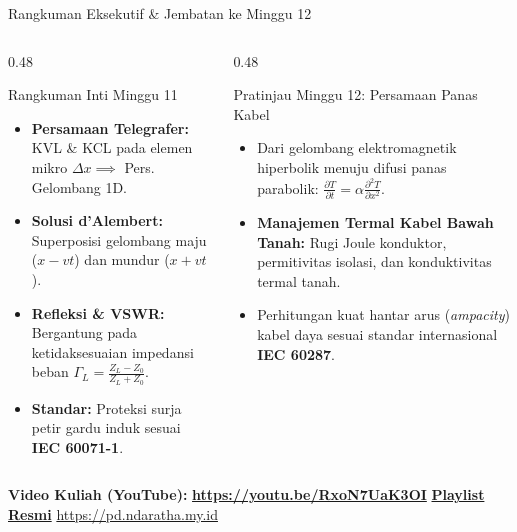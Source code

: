 \documentclass[aspectratio=169,10pt]{beamer}
\begin{document}
\begin{frame}{Rangkuman Eksekutif \& Jembatan ke Minggu 12}
  \begin{columns}[t]
    \begin{column}{0.48\textwidth}
      \begin{block}{Rangkuman Inti Minggu 11}
        \begin{itemize}
          \item \textbf{Persamaan Telegrafer:} KVL \& KCL pada elemen mikro $\Delta x \implies$ Pers. Gelombang 1D.
          \item \textbf{Solusi d'Alembert:} Superposisi gelombang maju ($x - vt$) dan mundur ($x + vt$).
          \item \textbf{Refleksi \& VSWR:} Bergantung pada ketidaksesuaian impedansi beban $\Gamma_L = \frac{Z_L - Z_0}{Z_L + Z_0}$.
          \item \textbf{Standar:} Proteksi surja petir gardu induk sesuai \textbf{IEC 60071-1}.
        \end{itemize}
      \end{block}
    \end{column}
    \begin{column}{0.48\textwidth}
      \begin{alertblock}{Pratinjau Minggu 12: Persamaan Panas Kabel}
        \begin{itemize}
          \item Dari gelombang elektromagnetik hiperbolik menuju difusi panas parabolik: $\frac{\partial T}{\partial t} = \alpha \frac{\partial^2 T}{\partial x^2}$.
          \item \textbf{Manajemen Termal Kabel Bawah Tanah:} Rugi Joule konduktor, permitivitas isolasi, dan konduktivitas termal tanah.
          \item Perhitungan kuat hantar arus (\textit{ampacity}) kabel daya sesuai standar internasional \textbf{IEC 60287}.
        \end{itemize}
      \end{alertblock}
    \end{column}
  \end{columns}
  \vspace{0.06cm}
  \begin{center}
    \scriptsize \textbf{Video Kuliah (YouTube):} {\color{red!80!black}\textbf{\url{https://youtu.be/RxoN7UaK3OI}}} \quad \textbar \quad \href{https://www.youtube.com/playlist?list=PLS5oOZWXZeTw}{\color{unibblue}\textbf{Playlist Resmi}} \quad \textbar \quad \url{https://pd.ndaratha.my.id}
  \end{center}
\end{frame}
\end{document}
